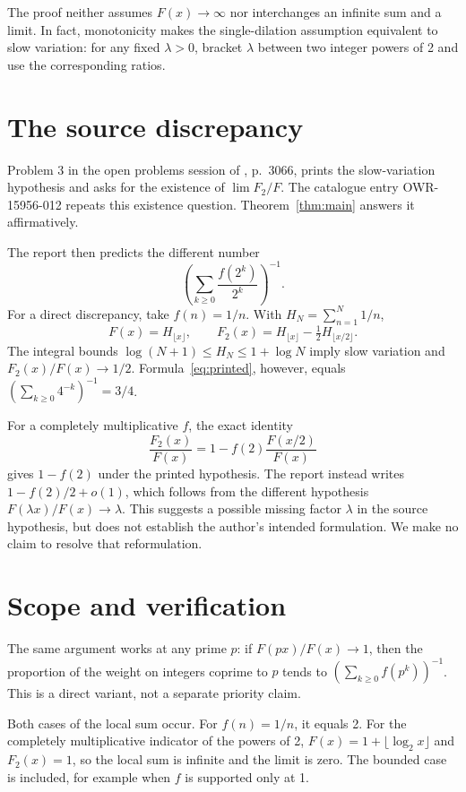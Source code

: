 \documentclass[11pt]{article}
\begin{document}
The proof neither assumes $F(x)\to\infty$ nor interchanges an infinite sum and a limit. In fact, monotonicity makes the single-dilation assumption equivalent to slow variation: for any fixed $\lambda>0$, bracket $\lambda$ between two integer powers of 2 and use the corresponding ratios.

\section{The source discrepancy}
Problem 3 in the open problems session of \cite{owr}, p.~3066, prints the slow-variation hypothesis and asks for the existence of $\lim F_2/F$. The catalogue entry OWR-15956-012 \cite{catalogue} repeats this existence question. Theorem~\ref{thm:main} answers it affirmatively.

The report then predicts the different number
\begin{equation}\label{eq:printed}
 \left(\sum_{k\ge0}\frac{f(2^k)}{2^k}\right)^{-1}.
\end{equation}
For a direct discrepancy, take $f(n)=1/n$. With $H_N=\sum_{n=1}^N1/n$,
\[
 F(x)=H_{\lfloor x\rfloor},\qquad
 F_2(x)=H_{\lfloor x\rfloor}-\tfrac12 H_{\lfloor x/2\rfloor}.
\]
The integral bounds $\log(N+1)\le H_N\le1+\log N$ imply slow variation and $F_2(x)/F(x)\to1/2$. Formula~\eqref{eq:printed}, however, equals $(\sum_{k\ge0}4^{-k})^{-1}=3/4$.

For a completely multiplicative $f$, the exact identity
\[
 \frac{F_2(x)}{F(x)}=1-f(2)\frac{F(x/2)}{F(x)}
\]
gives $1-f(2)$ under the printed hypothesis. The report instead writes $1-f(2)/2+o(1)$, which follows from the different hypothesis $F(\lambda x)/F(x)\to\lambda$. This suggests a possible missing factor $\lambda$ in the source hypothesis, but does not establish the author's intended formulation. We make no claim to resolve that reformulation.

\section{Scope and verification}
The same argument works at any prime $p$: if $F(px)/F(x)\to1$, then the proportion of the weight on integers coprime to $p$ tends to $(\sum_{k\ge0}f(p^k))^{-1}$. This is a direct variant, not a separate priority claim.

Both cases of the local sum occur. For $f(n)=1/n$, it equals 2. For the completely multiplicative indicator of the powers of 2, $F(x)=1+\lfloor\log_2x\rfloor$ and $F_2(x)=1$, so the local sum is infinite and the limit is zero. The bounded case is included, for example when $f$ is supported only at 1.
\end{document}
